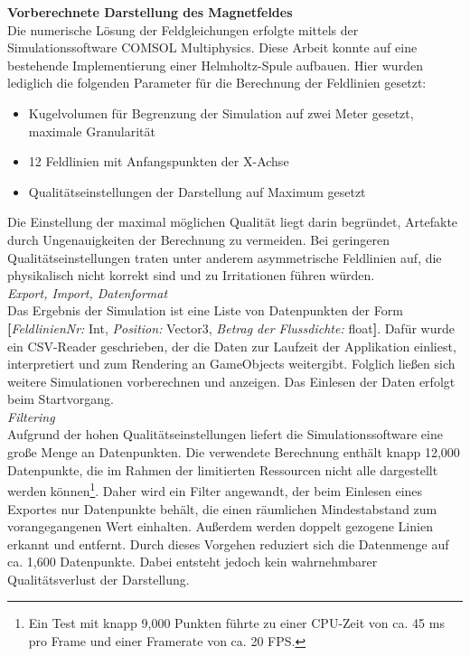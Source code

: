 \textbf{Vorberechnete Darstellung des Magnetfeldes}\\
Die numerische Lösung der Feldgleichungen erfolgte mittels der Simulationssoftware COMSOL Multiphysics. Diese Arbeit konnte auf eine bestehende Implementierung einer Helmholtz-Spule aufbauen. Hier wurden lediglich die folgenden Parameter für die Berechnung der Feldlinien gesetzt:
\begin{itemize}
	\setlength{\itemsep}{-1pt}
	\singlespacing
	\item Kugelvolumen für Begrenzung der Simulation auf zwei Meter gesetzt, maximale Granularität
	\item 12 Feldlinien mit Anfangspunkten der X-Achse
	\item Qualitätseinstellungen der Darstellung auf Maximum gesetzt
\end{itemize}

Die Einstellung der maximal möglichen Qualität liegt darin begründet, Artefakte durch Ungenauigkeiten der Berechnung zu vermeiden. Bei geringeren Qualitätseinstellungen traten unter anderem asymmetrische Feldlinien auf, die physikalisch nicht korrekt sind und zu Irritationen führen würden.\\

\textit{Export, Import, Datenformat}\\
Das Ergebnis der Simulation ist eine Liste von Datenpunkten der Form \textbf{[}\textit{FeldlinienNr:} Int, \textit{Position:} Vector3, \textit{Betrag der Flussdichte:} float\textbf{]}. Dafür wurde ein CSV-Reader geschrieben, der die Daten zur Laufzeit der Applikation einliest, interpretiert und zum Rendering an GameObjects weitergibt. Folglich ließen sich weitere Simulationen vorberechnen und anzeigen. Das Einlesen der Daten erfolgt beim Startvorgang.\\

\textit{Filtering}\\
Aufgrund der hohen Qualitätseinstellungen liefert die Simulationssoftware eine große Menge an Datenpunkten. Die verwendete Berechnung enthält knapp 12,000 Datenpunkte, die im Rahmen der limitierten Ressourcen nicht alle dargestellt werden können\footnote{Ein Test mit knapp 9,000 Punkten führte zu einer CPU-Zeit von ca. 45 ms pro Frame und einer Framerate von ca. 20 FPS.}. Daher wird ein Filter angewandt, der beim Einlesen eines Exportes nur Datenpunkte behält, die einen räumlichen Mindestabstand zum vorangegangenen Wert einhalten. Außerdem werden doppelt gezogene Linien erkannt und entfernt. Durch dieses Vorgehen reduziert sich die Datenmenge auf ca. 1,600 Datenpunkte. Dabei entsteht jedoch kein wahrnehmbarer Qualitätsverlust der Darstellung.\\

